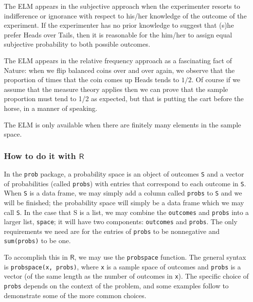 \documentclass[captions=tableheading]{scrbook}
\begin{document}
The ELM appears in the subjective approach when the experimenter resorts to indifference or ignorance with respect to his/her knowledge of the outcome of the experiment. If the experimenter has no prior knowledge to suggest that (s)he prefer Heads over Tails, then it is reasonable for the him/her to assign equal subjective probability to both possible outcomes.

The ELM appears in the relative frequency approach as a fascinating fact of Nature: when we flip balanced coins over and over again, we observe that the proportion of times that the coin comes up Heads tends to \(1/2\). Of course if we assume that the measure theory applies then we can prove that the sample proportion must tend to 1/2 as expected, but that is putting the cart before the horse, in a manner of speaking.

The ELM is only available when there are finitely many elements in the sample space.
\subsubsection{How to do it with \(\mathsf{R}\)}
\label{sec-4-3-4-1}


In the \texttt{prob} package, a probability space is an object of outcomes \texttt{S} and a vector of probabilities (called \texttt{probs}) with entries that correspond to each outcome in \texttt{S}. When \texttt{S} is a data frame, we may simply add a column called \texttt{probs} to \texttt{S} and we will be finished; the probability space will simply be a data frame which we may call \texttt{S}. In the case that S is a list, we may combine the \texttt{outcomes} and \texttt{probs} into a larger list, \texttt{space}; it will have two components: \texttt{outcomes} and \texttt{probs}. The only requirements we need are for the entries of \texttt{probs} to be nonnegative and \texttt{sum(probs)} to be one.

To accomplish this in \(\mathsf{R}\), we may use the \texttt{probspace} function. The general syntax is \texttt{probspace(x, probs)}, where \texttt{x} is a sample space of outcomes and \texttt{probs} is a vector (of the same length as the number of outcomes in \texttt{x}). The specific choice of \texttt{probs} depends on the context of the problem, and some examples follow to demonstrate some of the more common choices. 
\end{document}
